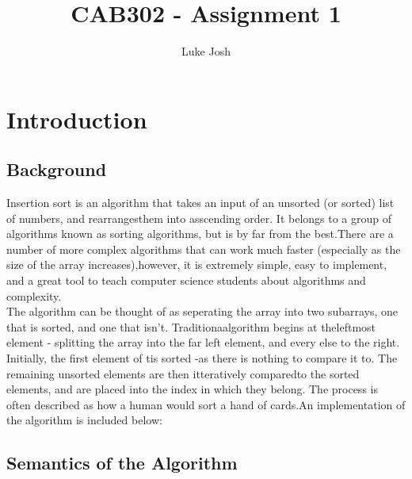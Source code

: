 \documentclass{article}
\title{CAB302 - Assignment 1}
\author{Luke Josh   }
\begin{document}

\maketitle\pagebreak
\tableofcontents
\pagebreak

\section{Introduction}
    \subsection{Background}
    Insertion sort is an algorithm that takes an input of an unsorted (or sorted) list of numbers, and rearrangesthem into asscending order. It belongs to a group of algorithms known as sorting algorithms, but is by far from the best.There are a number of more complex algorithms that can work much faster (especially as the size of the array increases),however, it is extremely simple, easy to implement, and a great tool to teach computer science students about algorithms and complexity.\\
    The algorithm can be thought of as seperating the array into two subarrays, one that is sorted, and one that isn't. Traditionaalgorithm begins at theleftmost element - splitting the array into the far left element, and every else to the right. Initially, the first element of tis sorted -as there is nothing to compare it to. The remaining unsorted elements are then itteratively comparedto the sorted elements, and are placed into the index in which they belong. The process is often described as how a human would sort a hand of cards.An implementation of the algorithm is included below:\\

    \subsection{Semantics of the Algorithm}
        \begin{algorithmic}[1]  
                    \EndWhile
                \EndFor
            \EndFunction
        \end{algorithmic}
\end{document}
